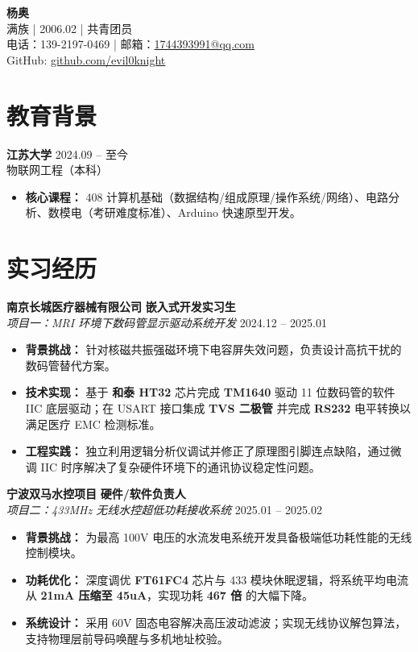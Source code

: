 \documentclass[11pt,a4paper]{article}
\begin{document}
\begin{center}
    {\LARGE \textbf{杨奥}} \\
    \vspace{0.8ex}
    满族 | 2006.02 | 共青团员 \\
    电话：139-2197-0469 | 邮箱：\href{mailto:1744393991@qq.com}{1744393991@qq.com} \\
    GitHub: \href{https://github.com/evil0knight}{github.com/evil0knight}
\end{center}

\section{教育背景}
\textbf{江苏大学} \hfill 2024.09 -- 至今 \\
物联网工程（本科） \hfill 
\begin{itemize}[leftmargin=1.5em, itemsep=0pt, topsep=2pt]
    \item \textbf{核心课程：} 408 计算机基础（数据结构/组成原理/操作系统/网络）、电路分析、数模电（考研难度标准）、Arduino 快速原型开发。
\end{itemize}

\section{实习经历}
\textbf{南京长城医疗器械有限公司} \hfill \textbf{嵌入式开发实习生} \\
\textit{项目一：MRI 环境下数码管显示驱动系统开发} \hfill 2024.12 -- 2025.01
\begin{itemize}[leftmargin=1.5em, itemsep=0pt]
    \item \textbf{背景挑战：} 针对核磁共振强磁环境下电容屏失效问题，负责设计高抗干扰的数码管替代方案。
    \item \textbf{技术实现：} 基于 \textbf{和泰 HT32} 芯片完成 \textbf{TM1640} 驱动 11 位数码管的软件 IIC 底层驱动；在 USART 接口集成 \textbf{TVS 二极管} 并完成 \textbf{RS232} 电平转换以满足医疗 EMC 检测标准。
    \item \textbf{工程实践：} 独立利用逻辑分析仪调试并修正了原理图引脚连点缺陷，通过微调 IIC 时序解决了复杂硬件环境下的通讯协议稳定性问题。
\end{itemize}

\vspace{1ex}

\textbf{宁波双马水控项目} \hfill \textbf{硬件/软件负责人} \\
\textit{项目二：433MHz 无线水控超低功耗接收系统} \hfill 2025.01 -- 2025.02
\begin{itemize}[leftmargin=1.5em, itemsep=0pt]
    \item \textbf{背景挑战：} 为最高 100V 电压的水流发电系统开发具备极端低功耗性能的无线控制模块。
    \item \textbf{功耗优化：} 深度调优 \textbf{FT61FC4} 芯片与 433 模块休眠逻辑，将系统平均电流从 \textbf{21mA 压缩至 45uA}，实现功耗 \textbf{467 倍} 的大幅下降。
    \item \textbf{系统设计：} 采用 60V 固态电容解决高压波动滤波；实现无线协议解包算法，支持物理层前导码唤醒与多机地址校验。
\end{itemize}
\end{document}
